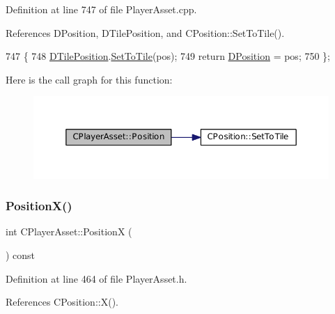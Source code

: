Definition at line 747 of file Player\+Asset.\+cpp.



References D\+Position, D\+Tile\+Position, and C\+Position\+::\+Set\+To\+Tile().


\begin{DoxyCode}
747                                                     \{
748     \hyperlink{classCPlayerAsset_a5b59a9d3b7db8c7fa194b80dafb96186}{DTilePosition}.\hyperlink{classCPosition_ae302aa21792de64c97de29e2cbbfeb94}{SetToTile}(pos);
749     \textcolor{keywordflow}{return} \hyperlink{classCPlayerAsset_aa9f53c009b181c7c5647c6b03776a04c}{DPosition} = pos;
750 \};
\end{DoxyCode}
Here is the call graph for this function\+:\nopagebreak
\begin{figure}[H]
\begin{center}
\leavevmode
\includegraphics[width=350pt]{classCPlayerAsset_a8c3ed4ab81f79aa28faec6bf790a0a79_cgraph}
\end{center}
\end{figure}
\hypertarget{classCPlayerAsset_a9cf8961ac97f2928d1e08bc4f311f220}{}\label{classCPlayerAsset_a9cf8961ac97f2928d1e08bc4f311f220} 
\subsubsection{\texorpdfstring{Position\+X()}{PositionX()}\hspace{0.1cm}{\footnotesize\ttfamily [1/2]}}
{\footnotesize\ttfamily int C\+Player\+Asset\+::\+PositionX (\begin{DoxyParamCaption}{ }\end{DoxyParamCaption}) const\hspace{0.3cm}{\ttfamily [inline]}}



Definition at line 464 of file Player\+Asset.\+h.



References C\+Position\+::\+X().



